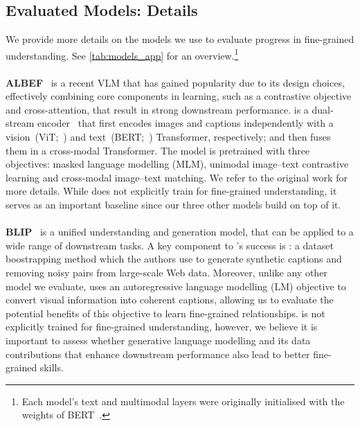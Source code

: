 \subsection{Evaluated Models: Details} \label{app:models}
We provide more details on the models we use to evaluate progress in fine-grained \vl understanding.
See \cref{tab:models_app} for an overview.\footnote{Each model's text and multimodal layers were originally initialised with the weights of BERT~\cite{bert}.}

\paragraph{}
\noindent\textbf{ALBEF}~\cite{albef} is a recent VLM that has gained popularity due to its design choices, effectively combining core components in \vl learning, such as a contrastive objective and cross-attention, that result in strong downstream performance.
\albef is a dual-stream encoder~\cite{unmasked} that first encodes images and captions independently with a vision~(ViT;~\citealt{vit,deit}) and text~(BERT;~\citealt{bert}) Transformer, respectively; and then fuses them in a cross-modal Transformer.
The model is pretrained with three objectives: masked language modelling (MLM), unimodal image--text contrastive learning and cross-modal image--text matching.
We refer to the original work for more details.
While \albef does not explicitly train for fine-grained understanding, it serves as an important baseline since our three other models build on top of it.

\paragraph{}
\noindent \textbf{BLIP}~\cite{blip} is a unified \vl understanding and generation model, that can be applied to a wide range of downstream tasks.
A key component to \blip's success is \capfilt: a dataset boostrapping method which the authors use to generate synthetic captions and removing noisy pairs from large-scale Web data.
Moreover, unlike any other model we evaluate, \blip uses an autoregressive language modelling (LM) objective to convert visual information into coherent captions, allowing us to evaluate the potential benefits of this objective to learn fine-grained relationships.
\blip is not explicitly trained for fine-grained understanding, however, we believe it is important to assess whether generative language modelling and its data contributions that enhance downstream performance also lead to better fine-grained skills.

